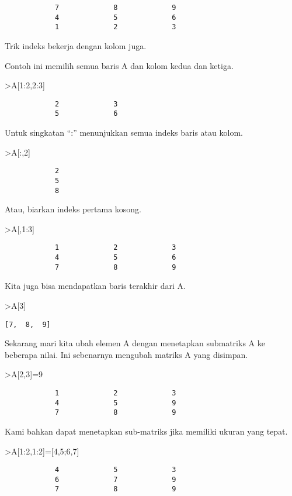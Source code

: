 \documentclass[
]{book}
\begin{document}
\begin{verbatim}
            7             8             9 
            4             5             6 
            1             2             3 
\end{verbatim}

Trik indeks bekerja dengan kolom juga.

Contoh ini memilih semua baris A dan kolom kedua dan ketiga.

\textgreater A{[}1:2,2:3{]}

\begin{verbatim}
            2             3 
            5             6 
\end{verbatim}

Untuk singkatan ``:'' menunjukkan semua indeks baris atau kolom.

\textgreater A{[}:,2{]}

\begin{verbatim}
            2 
            5 
            8 
\end{verbatim}

Atau, biarkan indeks pertama kosong.

\textgreater A{[},1:3{]}

\begin{verbatim}
            1             2             3 
            4             5             6 
            7             8             9 
\end{verbatim}

Kita juga bisa mendapatkan baris terakhir dari A.

\textgreater A{[}3{]}

\begin{verbatim}
[7,  8,  9]
\end{verbatim}

Sekarang mari kita ubah elemen A dengan menetapkan submatriks A ke beberapa nilai. Ini sebenarnya mengubah matriks A yang disimpan.

\textgreater A{[}2,3{]}=9

\begin{verbatim}
            1             2             3 
            4             5             9 
            7             8             9 
\end{verbatim}

Kami bahkan dapat menetapkan sub-matriks jika memiliki ukuran yang tepat.

\textgreater A{[}1:2,1:2{]}={[}4,5;6,7{]}

\begin{verbatim}
            4             5             3 
            6             7             9 
            7             8             9 
\end{verbatim}
\end{document}
